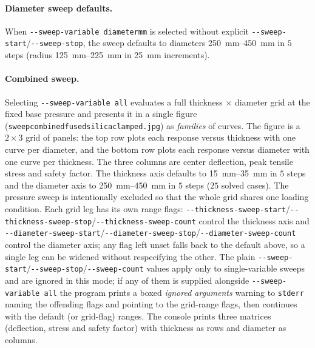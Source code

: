 \documentclass[11pt]{article}
\newcommand{\codeus}{\textunderscore\allowbreak}
\DeclareRobustCommand{\code}[1]{\texttt{\ifmmode\else\renewcommand{\_}{\codeus}\fi#1}}
\begin{document}
\paragraph{Diameter sweep defaults.} When \code{-{}-sweep-variable diameter\_mm} is
selected without explicit \code{-{}-sweep-start}/\code{-{}-sweep-stop}, the sweep
defaults to diameters \qtyrange{250}{450}{\milli\meter} in $5$ steps (radius \qtyrange{125}{225}{\milli\meter} in
\qty{25}{\milli\meter} increments).

\paragraph{Combined sweep.} Selecting \code{-{}-sweep-variable all} evaluates a
full thickness $\times$ diameter grid at the fixed base pressure and presents it
in a single figure (\code{sweep\_combined\_fused\_silica\_clamped.jpg}) as \emph{families} of curves. The
figure is a $2\times 3$ grid of panels: the top row plots each response versus
thickness with one curve per diameter, and the bottom row plots each response
versus diameter with one curve per thickness. The three columns are center
deflection, peak tensile stress and safety factor. The thickness axis defaults to
\qtyrange{15}{35}{\milli\meter} in $5$ steps and the diameter axis to \qtyrange{250}{450}{\milli\meter} in $5$ steps
($25$ solved cases). The pressure sweep is intentionally excluded so that the
whole grid shares one loading condition. Each grid leg has its own range flags:
\code{-{}-thickness-sweep-start}/\code{-{}-thickness-sweep-stop}/\code{-{}-thickness-sweep-count}
control the thickness axis and
\code{-{}-diameter-sweep-start}/\code{-{}-diameter-sweep-stop}/\code{-{}-diameter-sweep-count}
control the diameter axis; any flag left unset falls back to the default above, so a
single leg can be widened without respecifying the other. The plain
\code{-{}-sweep-start}/\code{-{}-sweep-stop}/\code{-{}-sweep-count} values apply only to
single-variable sweeps and are ignored in this mode; if any of them is supplied
alongside \code{-{}-sweep-variable all} the program prints a boxed
\emph{ignored arguments} warning to \code{stderr} naming the offending flags and
pointing to the grid-range flags, then continues with the default (or
grid-flag) ranges. The console prints three
matrices (deflection, stress and safety factor) with thickness as rows and diameter
as columns.
\end{document}
